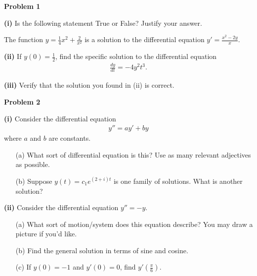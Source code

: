 \documentclass[12pt]{amsbook}
\newcommand{\DD}{\displaystyle}
\begin{document}
\newpage

\textbf{Problem 1}

\vspace{.25cm}

\textbf{(i)} Is the following statement True or False? Justify your answer.
\begin{center}
The function $\DD y=\frac{1}{4}x^2+\frac{2}{x^2}$ is a solution to the differential equation $\DD y' = \frac{x^2-2y}{x}$.
\end{center}

\vspace{5cm}

\textbf{(ii)} If $y(0) = \frac{1}{2}$, find the specific solution to the differential equation
\begin{align*}
\frac{dy}{dt} = -4y^2t^3.
\end{align*}



\vspace{11cm}

\textbf{(iii)} Verify that the solution you found in (ii) is correct.





\newpage

\textbf{Problem 2}

\vspace{.25cm}

\textbf{(i)} Consider the differential equation
\begin{align*}
y'' = ay' + by
\end{align*}
where $a$ and $b$ are constants.
\begin{itemize}
\item[(a)] What sort of differential equation is this? Use as many relevant adjectives as possible.
\item[(b)] Suppose $y(t) = c_1e^{(2+i)t}$ is one family of solutions. What is another solution?
\end{itemize}


\vspace{6cm}


\textbf{(ii)} Consider the differential equation $y'' = -y$.
\begin{itemize}
\item[(a)] What sort of motion/system does this equation describe? You may draw a picture if you'd like.
\item[(b)] Find the general solution in terms of sine and cosine.
\item[(c)] If $y(0)=-1$ and $y'(0) = 0$, find $y'\left(\frac{\pi}{6}\right)$.
\end{itemize}
\end{document}
